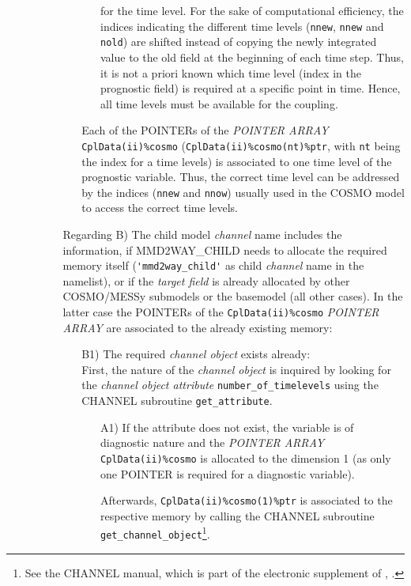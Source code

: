 \documentclass[11pt,twoside]{article}
\begin{document}
\begin{itemize}
\begin{enumerate}
\begin{itemize}
\begin{itemize}
\begin{itemize}
for the time level. For the sake of computational efficiency, 
 the indices indicating the different time levels (\verb|nnew|, \verb|nnew| and
\verb|nold|) are shifted instead of copying the newly integrated value to the 
old field at the beginning of each time step. 
Thus, it is not a priori known which time level (index in the prognostic 
field) is required at a specific point in time. 
Hence, all time levels must be available for the coupling.
\end{itemize}%
Each of the {\footnotesize POINTERs} of the {\footnotesize \it POINTER ARRAY} 
\verb|CplData(ii)%cosmo| (\verb|CplData(ii)%cosmo(nt)%ptr|, with \verb|nt| being
the index for a time levels) is 
 associated to one time level of the prognostic variable. Thus, the correct
time level can be addressed by the indices (\verb|nnew| and \verb|nnow|) usually
used in the COSMO model to access the correct time levels.
\end{itemize}%

\item[Regarding B)] The child model {\it channel} name includes the
 information, if MMD2WAY\_CHILD
needs to allocate the required memory itself (\verb|'mmd2way_child'| as child 
{\it channel} name in the namelist), or if the {\it target field} is already 
allocated by other COSMO/MESSy submodels or the basemodel (all other cases).
 In the latter case
the {\footnotesize POINTERs} of the \verb|CplData(ii)%cosmo| 
{\footnotesize \it POINTER ARRAY}
 are associated to the already existing memory:
\begin{itemize}%
\item[B1)] The required {\it channel object} exists already:\\
First, the nature of the {\it channel object} is inquired by looking for the 
{\it channel object attribute} \verb|number_of_timelevels| using the CHANNEL 
subroutine \verb|get_attribute|. 
\begin{itemize} %
\item[A1)] If the attribute does not exist, the variable is of
diagnostic nature  
and the {\footnotesize \it POINTER ARRAY} \verb|CplData(ii)%cosmo| is allocated 
to the dimension 1 
 (as only one {\footnotesize POINTER} is required for a diagnostic variable). 

Afterwards, \verb|CplData(ii)%cosmo(1)%ptr| is associated to the respective 
memory by calling
the CHANNEL subroutine \verb|get_channel_object|\footnote{See the CHANNEL manual,
 which is part of the electronic supplement of \citeauthor{Joeckel10a}, 
\citeyear{Joeckel10a}.}.


\end{itemize}
\end{itemize}
\end{itemize}
\end{enumerate}
\end{itemize}
\end{document}
